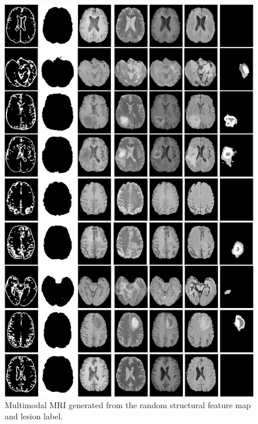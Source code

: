 \documentclass[letterpaper]{article} %
\begin{document}
\begin{figure}
	\centering
	\includegraphics[width=0.75\linewidth]{figures/F_to_MRI}
	\caption{Multimodal MRI generated from the random structural feature map and lesion label.}
	\label{generated_mri}
\end{figure}
\end{document}
